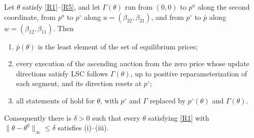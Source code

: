 \begin{lemma}\label{lem:two-good-robustness}
Let $\theta$ satisfy \ref{R1}--\ref{R5}, and let $\Gamma(\theta)$ run from $(0,0)$ to $p^a$ along the second coordinate, from $p^a$ to $p^\circ$ along $u=(\beta_{22},\beta_{21})$, and from $p^\circ$ to $\bar p$ along $w=(\beta_{12},\beta_{11})$. Then
\begin{enumerate}[label=\textup{(\roman*)},leftmargin=2.2em]
\item $\bar p(\theta)$ is the least element of the set of equilibrium prices;
\item every execution of the ascending auction from the zero price whose update directions satisfy LSC follows $\Gamma(\theta)$, up to positive reparameterization of each segment, and its direction resets at $p^\circ$;
\item all statements of  hold for $\theta$, with $p^\circ$ and $\Gamma$ replaced by $p^\circ(\theta)$ and $\Gamma(\theta)$.
\end{enumerate}
Consequently there is $\delta>0$ such that every $\theta$ satisfying \ref{R1} with $\lVert\theta-\theta^0\rVert_\infty\le\delta$ satisfies \textup{(i)}--\textup{(iii)}.
\end{lemma}

